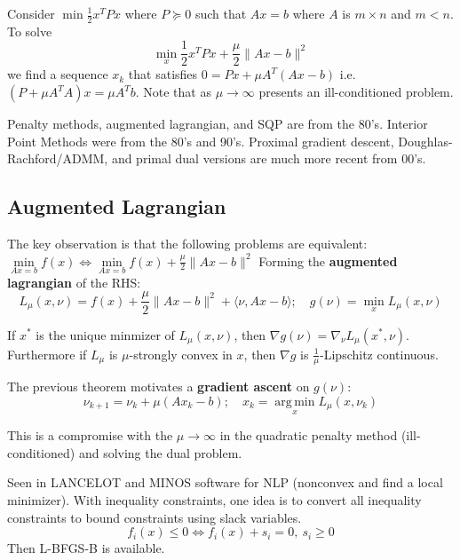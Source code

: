 \documentclass[english, 11pt]{article}
\DeclareMathOperator*{\argmin}{arg\,min}
\begin{document}
\begin{exmp}
Consider $\min \frac{1}{2} x^T P x$ where $P \succeq 0$ such that $Ax=b$ where $A$ is $m \times n$ and $m<n$. 
To solve
\[
\min \limits_x \frac{1}{2} x^T Px + \frac{\mu}{2} \|Ax-b\|^2
\]
we find a sequence $x_k$ that satisfies $0 = Px + \mu A^T (Ax-b)$ i.e. $(P + \mu A^T A) x = \mu A^T b$. Note that as $\mu \to \infty$ presents an ill-conditioned problem.
\end{exmp}









\begin{rem}
Penalty methods, augmented lagrangian, and SQP are from the 80's. Interior Point Methods were from the 80's and 90's. Proximal gradient descent, Doughlas-Rachford/ADMM, and primal dual versions are much more recent from 00's.
\end{rem}


\subsection{Augmented Lagrangian}
The key observation is that the following problems are equivalent:
$\min \limits_{Ax=b} f(x) \iff \min \limits_{Ax=b}  f(x) + \frac{\mu}{2} \|Ax-b\|^2$
Forming the {\bf augmented lagrangian} of the RHS:
\[
L_\mu(x,\nu) = f(x) + \frac{\mu}{2} \|Ax-b\|^2 + \langle \nu, Ax-b \rangle; \quad g(\nu) = \min \limits_x L_\mu(x,\nu)
\]

\begin{thrm}
If $x^*$ is the unique minmizer of $L_\mu(x,\nu)$, then $\nabla g(\nu) = \nabla_\nu L_\mu(x^*,\nu)$. Furthermore if $L_\mu$ is $\mu$-strongly convex in $x$, then $\nabla g$ is $\frac{1}{\mu}$-Lipschitz continuous.
\end{thrm}


The previous theorem motivates a {\bf gradient ascent} on $g(\nu)$:
\[
\nu_{k+1} = \nu_k + \mu \left( Ax_k - b \right); \quad x_k = \argmin \limits_x L_\mu(x,\nu_k)
\]


\begin{rem}
This is a compromise with the $\mu \to \infty$ in the quadratic penalty method (ill-conditioned) and solving the dual problem.
\end{rem}

\begin{rem}
Seen in LANCELOT and MINOS software for NLP (nonconvex and find a local minimizer). With inequality constraints, one idea is to convert all inequality constraints to bound constraints using slack variables. 
\[
f_i(x) \le 0 \iff f_i(x) + s_i =0, \ s_i \ge 0
\]
Then L-BFGS-B is available.
\end{rem}
\end{document}
